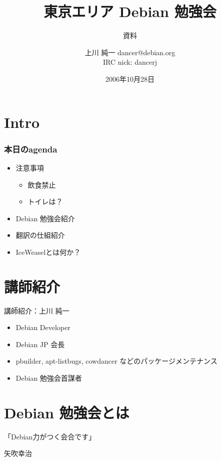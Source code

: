 \documentclass[cjk,dvipdfmx]{beamer}
\title{東京エリア Debian 勉強会}
\subtitle{資料}
\author{上川 純一 dancer@debian.org\\IRC nick: dancerj}
\date{2006年10月28日}
\begin{document}
\frame{\titlepage{}}

\section{Intro}

\begin{frame}
 \frametitle{本日のagenda}
\begin{minipage}[t]{0.4\hsize}
  \begin{itemize}
  \item 注意事項
	\begin{itemize}
	 \item 飲食禁止
	 \item トイレは？
	\end{itemize}
 \end{itemize}
\end{minipage} 
\begin{minipage}[t]{0.4\hsize}
 \begin{itemize}
  \item Debian 勉強会紹介
  \item 翻訳の仕組紹介
  \item IceWeaselとは何か？
 \end{itemize}
\end{minipage}
\end{frame}

\section*{講師紹介}
\begin{frame}{講師紹介：上川 純一}
 \begin{itemize}
  \item Debian Developer
  \item Debian JP 会長
  \item pbuilder, apt-listbugs, cowdancer などのパッケージメンテナンス
  \item Debian 勉強会首謀者
 \end{itemize}
\end{frame}

\section{Debian 勉強会とは}
\begin{frame}
 
「Debian力がつく会合です」

\hfill{}矢吹幸治
\end{frame}
\end{document}
